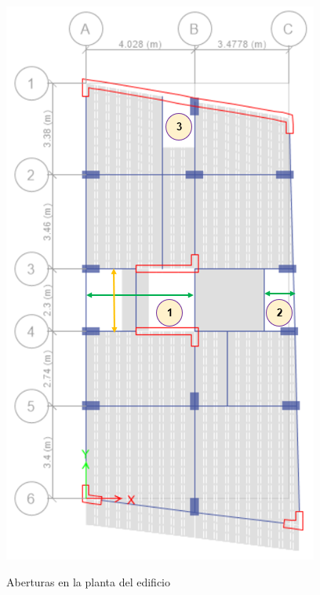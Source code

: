 \documentclass[12pt]{article}
\begin{document}
\begin{figure}[h!]
    \centering
    \caption{Aberturas en la planta del edificio}
    \includegraphics[scale=1]{IMAGENES/17.PNG}
    \label{fig:my_label}
\end{figure}
\end{document}
